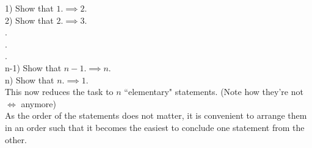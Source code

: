 1) Show that $1.\implies 2.$\\
2) Show that $2. \implies 3.$\\
.\\
.\\
.\\
n-1) Show that $n-1. \implies n.$\\
n) Show that $n. \implies 1.$\\
This now reduces the task to $n$ ``elementary" statements. (Note how they're not $\iff$ anymore)\\
As the order of the statements does not matter, it is convenient to arrange them in an order such that it becomes the easiest to conclude one statement from the other.\\